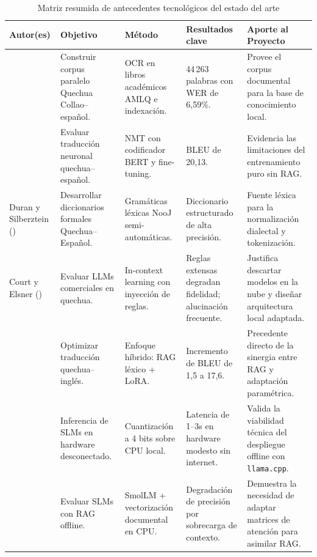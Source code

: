 \begin{table}[H]
\centering
\caption{Matriz resumida de antecedentes tecnológicos del estado del arte}
\label{tab:antecedentes}
\small
\begin{tabularx}{\textwidth}{@{}p{2.3cm}p{2.4cm}p{2.3cm}p{2.6cm}X@{}}
\toprule
\textbf{Autor(es)} & \textbf{Objetivo} & \textbf{Método} & \textbf{Resultados clave} & \textbf{Aporte al Proyecto} \\
\midrule
\citet{Orcotoma2025} & Construir corpus paralelo Quechua Collao--español. & OCR en libros académicos AMLQ e indexación. & 44\,263 palabras con WER de 6,59\%. & Provee el corpus documental para la base de conocimiento local. \\
\midrule
\citet{SullaTorres2024} & Evaluar traducción neuronal quechua--español. & NMT con codificador BERT y fine-tuning. & BLEU de 20,13. & Evidencia las limitaciones del entrenamiento puro sin RAG. \\
\midrule
Duran y Silberztein (\citeyear{Duran2026}) & Desarrollar diccionarios formales Quechua--Español. & Gramáticas léxicas NooJ semi-automáticas. & Diccionario estructurado de alta precisión. & Fuente léxica para la normalización dialectal y tokenización. \\
\midrule
Court y Elsner (\citeyear{Court2024}) & Evaluar LLMs comerciales en quechua. & In-context learning con inyección de reglas. & Reglas extensas degradan fidelidad; alucinación frecuente. & Justifica descartar modelos en la nube y diseñar arquitectura local adaptada. \\
\midrule
\citet{Chen2024} & Optimizar traducción quechua--inglés. & Enfoque híbrido: RAG léxico + LoRA. & Incremento de BLEU de 1,5 a 17,6. & Precedente directo de la sinergia entre RAG y adaptación paramétrica. \\
\midrule
\citet{Walusimbi2026} & Inferencia de SLMs en hardware desconectado. & Cuantización a 4 bits sobre CPU local. & Latencia de 1--3s en hardware modesto sin internet. & Valida la viabilidad técnica del despliegue offline con \texttt{llama.cpp}. \\
\midrule
\citet{Hevia2025} & Evaluar SLMs con RAG offline. & SmolLM + vectorización documental en CPU. & Degradación de precisión por sobrecarga de contexto. & Demuestra la necesidad de adaptar matrices de atención para asimilar RAG. \\
\bottomrule
\end{tabularx}
\end{table}

